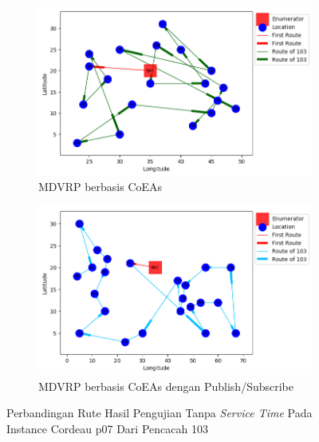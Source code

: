 \begin{figure}[H]
	\centering
	\begin{subfigure}[t]{\textwidth}
		\centering
		\includegraphics[width=\textwidth]{Resources/Images/cordeau_p07/cordeau_p07_notw_103_coes}
		\caption{MDVRP berbasis CoEAs}
		\label{fig:cordeau_p07_notw_103_coes}
	\end{subfigure}
	\begin{subfigure}[t]{\textwidth}
		\centering
		\includegraphics[width=\textwidth]{Resources/Images/cordeau_p07/cordeau_p07_notw_103_pubsub_coes}
		\caption{MDVRP berbasis CoEAs dengan Publish/Subscribe}
		\label{fig:cordeau_p07_notw_103_pubsub_coes}
	\end{subfigure}
	\caption{Perbandingan Rute Hasil Pengujian Tanpa \textit{Service Time} Pada Instance Cordeau p07 Dari Pencacah 103}
	\label{fig:cordeau_p07_notw_103}
\end{figure}


